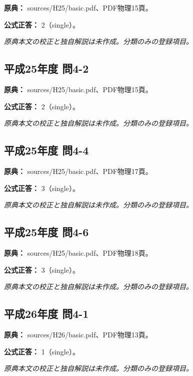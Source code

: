 \noindent\textbf{原典：} sources/H25/basic.pdf、PDF物理15頁。

\textbf{公式正答：} 2（single）。

\par\textit{原典本文の校正と独自解説は未作成。分類のみの登録項目。}

\subsection{平成25年度 問4-2}
\label{q:h25-reg-basic-4-2}

\noindent\textbf{原典：} sources/H25/basic.pdf、PDF物理15頁。

\textbf{公式正答：} 2（single）。

\par\textit{原典本文の校正と独自解説は未作成。分類のみの登録項目。}

\subsection{平成25年度 問4-4}
\label{q:h25-reg-basic-4-4}

\noindent\textbf{原典：} sources/H25/basic.pdf、PDF物理17頁。

\textbf{公式正答：} 3（single）。

\par\textit{原典本文の校正と独自解説は未作成。分類のみの登録項目。}

\subsection{平成25年度 問4-6}
\label{q:h25-reg-basic-4-6}

\noindent\textbf{原典：} sources/H25/basic.pdf、PDF物理18頁。

\textbf{公式正答：} 3（single）。

\par\textit{原典本文の校正と独自解説は未作成。分類のみの登録項目。}

\subsection{平成26年度 問4-1}
\label{q:h26-reg-basic-4-1}

\noindent\textbf{原典：} sources/H26/basic.pdf、PDF物理13頁。

\textbf{公式正答：} 1（single）。

\par\textit{原典本文の校正と独自解説は未作成。分類のみの登録項目。}

